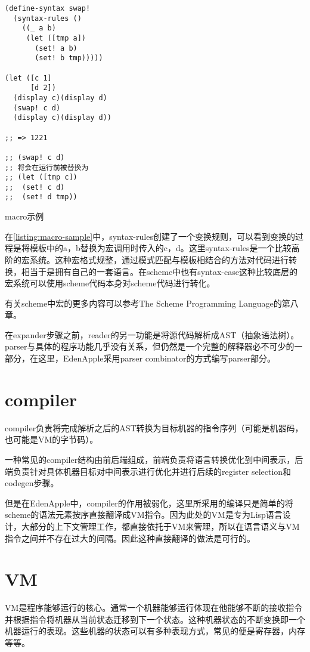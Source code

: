 \begin{code}
\begin{verbatim}
(define-syntax swap!
  (syntax-rules ()
    ((_ a b)
     (let ([tmp a])
       (set! a b)
       (set! b tmp)))))

(let ([c 1]
      [d 2])
  (display c)(display d)
  (swap! c d)
  (display c)(display d))

;; => 1221

;; (swap! c d) 
;; 将会在运行前被替换为
;; (let ([tmp c])
;;  (set! c d)
;;  (set! d tmp))
\end{verbatim}
\caption{macro示例}
\label{listing:macro-sample}
\end{code}

在\ref{listing:macro-sample}中，syntax-rules创建了一个变换规则，可以看到变换的过程是将模板中的a，b替换为宏调用时传入的c，d。这里syntax-rules是一个比较高阶的宏系统。这种宏格式规整，通过模式匹配与模板相结合的方法对代码进行转换，相当于是拥有自己的一套语言。在scheme中也有syntax-case这种比较底层的宏系统可以使用scheme代码本身对scheme代码进行转化。

有关scheme中宏的更多内容可以参考The Scheme Programming Language\cite{dybvig09scm}的第八章。

在expander步骤之前，reader的另一功能是将源代码解析成AST（抽象语法树）。parser与具体的程序功能几乎没有关系，但仍然是一个完整的解释器必不可少的一部分，在这里，EdenApple采用parser combinator的方式编写parser部分。

\section{compiler}

compiler负责将完成解析之后的AST转换为目标机器的指令序列（可能是机器码，也可能是VM的字节码）。

一种常见的compiler结构由前后端组成，前端负责将语言转换优化到中间表示，后端负责针对具体机器目标对中间表示进行优化并进行后续的register selection和codegen步骤。

但是在EdenApple中，compiler的作用被弱化，这里所采用的编译只是简单的将scheme的语法元素按序直接翻译成VM指令。因为此处的VM是专为Lisp语言设计，大部分的上下文管理工作，都直接依托于VM来管理，所以在语言语义与VM指令之间并不存在过大的间隔。因此这种直接翻译的做法是可行的。

\section{VM}

VM是程序能够运行的核心。通常一个机器能够运行体现在他能够不断的接收指令并根据指令将机器从当前状态迁移到下一个状态。这种机器状态的不断变换即一个机器运行的表现。这些机器的状态可以有多种表现方式，常见的便是寄存器，内存等等。

